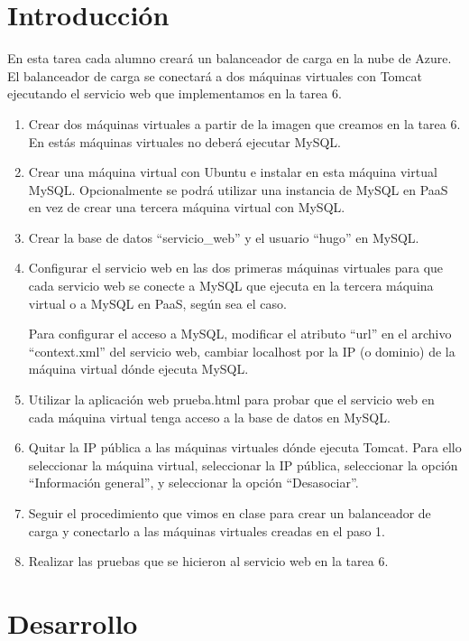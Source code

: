 \documentclass[11pt]{article}
\begin{document}
	\section{Introducción}
	En esta tarea cada alumno creará un balanceador de carga en la nube de Azure. El balanceador de carga se conectará a dos máquinas virtuales con Tomcat ejecutando el servicio web que implementamos en la tarea 6.
		\begin{enumerate}
			\item Crear dos máquinas virtuales a partir de la imagen que creamos en la tarea 6. En estás máquinas virtuales no deberá ejecutar MySQL.
			\item Crear una máquina virtual con Ubuntu e instalar en esta máquina virtual MySQL. Opcionalmente se podrá utilizar una instancia de MySQL en PaaS en vez de crear una tercera máquina virtual con MySQL.
			\item Crear la base de datos ``servicio\_web'' y el usuario ``hugo'' en MySQL.
			\item  Configurar el servicio web en las dos primeras máquinas virtuales para que cada servicio web se conecte a MySQL que ejecuta en la tercera máquina virtual o a MySQL en PaaS, según sea el caso.\par Para configurar el acceso a MySQL, modificar el atributo ``url'' en el archivo ``context.xml'' del servicio web, cambiar localhost por la IP (o dominio) de la máquina virtual dónde ejecuta MySQL.
			\item Utilizar la aplicación web prueba.html para probar que el servicio web en cada máquina virtual tenga acceso a la base de datos en MySQL.
			\item Quitar la IP pública a las máquinas virtuales dónde ejecuta Tomcat. Para ello seleccionar la máquina virtual, seleccionar la IP pública, seleccionar la opción ``Información general'', y seleccionar la opción ``Desasociar''.
			\item Seguir el procedimiento que vimos en clase para crear un balanceador de carga y conectarlo a las máquinas virtuales creadas en el paso 1.
			\item Realizar las pruebas que se hicieron al servicio web en la tarea 6.
		\end{enumerate}
	\section{Desarrollo}
\end{document}
